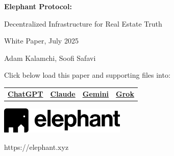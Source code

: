 \begin{titlepage}
\centering

\vspace{5cm}

{\Huge\bfseries Elephant Protocol:}

\vspace{0.5cm}

{\Large Decentralized Infrastructure for Real Estate Truth}

\vspace{1cm}

{\large White Paper, July 2025}

\vspace{0.5cm}

{\large Adam Kalamchi, Soofi Safavi}

\vspace{5cm}

{\large Click below load this paper and supporting files into:}

\vspace{1cm}

\begin{center}
\begin{tabular}{cccc}

\href{https://chat.openai.com/}{\textbf{ChatGPT}} &
\href{https://claude.ai/}{\textbf{Claude}} &
\href{https://gemini.google.com/}{\textbf{Gemini}} &
\href{https://x.ai/}{\textbf{Grok}}
\end{tabular}
\end{center}

\vspace{7cm}

\includegraphics[width=6cm]{elephant_horizontal_logo_black.png}

\vspace{1cm}

{\large https://elephant.xyz}

\end{titlepage}